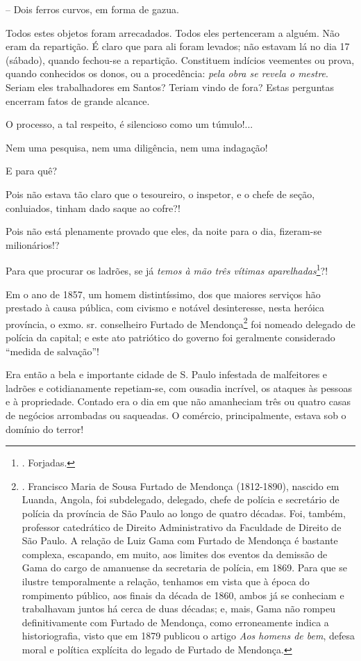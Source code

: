 -- Dois ferros curvos, em forma de gazua.

Todos estes objetos foram arrecadados. Todos eles pertenceram a alguém.
Não eram da repartição. É claro que para ali foram levados; não estavam
lá no dia 17 (sábado), quando fechou-se a repartição. Constituem
indícios veementes ou prova, quando conhecidos os donos, ou a
procedência: \emph{pela obra se revela o mestre}. Seriam eles
trabalhadores em Santos? Teriam vindo de fora? Estas perguntas encerram
fatos de grande alcance.

O processo, a tal respeito, é silencioso como um túmulo!...

Nem uma pesquisa, nem uma diligência, nem uma indagação!

E para quê?

Pois não estava tão claro que o tesoureiro, o inspetor, e o chefe de
seção, conluiados, tinham dado saque ao cofre?!

Pois não está plenamente provado que eles, da noite para o dia,
fizeram-se milionários!?

Para que procurar os ladrões, se já \emph{temos à mão três vítimas
aparelhadas}\footnote{. Forjadas.}?!

Em o ano de 1857, um homem distintíssimo, dos que maiores serviços hão
prestado à causa pública, com civismo e notável desinteresse, nesta
heróica província, o exmo. sr. conselheiro Furtado de Mendonça\footnote{.
  Francisco Maria de Sousa Furtado de Mendonça (1812-1890), nascido em
  Luanda, Angola, foi subdelegado, delegado, chefe de polícia e
  secretário de polícia da província de São Paulo ao longo de quatro
  décadas. Foi, também, professor catedrático de Direito Administrativo
  da Faculdade de Direito de São Paulo. A relação de Luiz Gama com
  Furtado de Mendonça é bastante complexa, escapando, em muito, aos
  limites dos eventos da demissão de Gama do cargo de amanuense da
  secretaria de polícia, em 1869. Para que se ilustre temporalmente a
  relação, tenhamos em vista que à época do rompimento público, aos
  finais da década de 1860, ambos já se conheciam e trabalhavam juntos
  há cerca de duas décadas; e, mais, Gama não rompeu definitivamente com
  Furtado de Mendonça, como erroneamente indica a historiografia, visto
  que em 1879 publicou o artigo \emph{Aos homens de bem}, defesa moral e
  política explícita do legado de Furtado de Mendonça.} foi nomeado
delegado de polícia da capital; e este ato patriótico do governo foi
geralmente considerado ``medida de salvação''!

Era então a bela e importante cidade de S. Paulo infestada de
malfeitores e ladrões e cotidianamente repetiam-se, com ousadia
incrível, os ataques às pessoas e à propriedade. Contado era o dia em
que não amanheciam três ou quatro casas de negócios arrombadas ou
saqueadas. O comércio, principalmente, estava sob o domínio do terror!

